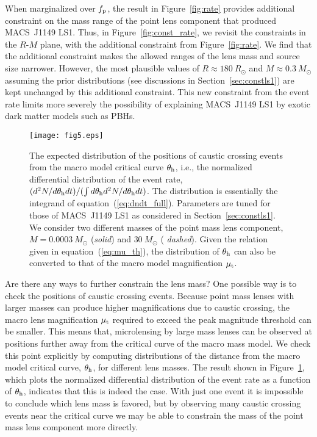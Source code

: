 \documentclass[showpacs,twocolumn,preprintnumbers,amsmath,amssymb,superscriptaddress,nofootinbib]{revtex4}
\begin{document}
When marginalized over $f_{\rm p}$, the result in
Figure~\ref{fig:rate} provides additional constraint on the mass range
of the point lens component that produced MACS~J1149 LS1. Thus, in
Figure~\ref{fig:const_rate}, we revisit the constraints in the $R$-$M$
plane, with the additional constraint from Figure~\ref{fig:rate}. We
find that the additional constraint makes the allowed ranges of the
lens mass and source size narrower. However, the most plausible values
of $R\approx 180~R_\odot$ and $M\approx 0.3~M_\odot$ assuming the
prior distributions (see discussions in Section~\ref{sec:constls1}) are
kept unchanged by this additional constraint. This new constraint from
the event rate limits more severely the possibility of explaining
MACS~J1149 LS1 by exotic dark matter models such as PBHs.

\begin{figure}[t]
\begin{center}
\texttt{[image: fig5.eps]}
\end{center}
\caption{The expected distribution of the positions of caustic
  crossing events from the macro model critical curve $\theta_{\rm
    h}$, i.e., the normalized differential distribution of the event
  rate, $(d^2N/d\theta_{\rm h}dt)/(\int d\theta_{\rm h}
  d^2N/d\theta_{\rm h}dt)$.  The distribution is essentially the
  integrand of equation~(\ref{eq:dndt_full}). Parameters are tuned for
  those of MACS~J1149 LS1 as considered in Section~\ref{sec:constls1}. We
  consider two different masses of the point mass lens component,
   $M=0.0003~M_\odot$ ({\it solid}) and $30~M_\odot$ ({\it
    dashed}). Given the relation given in equation~(\ref{eq:mu_th}),
  the distribution of $\theta_{\rm h}$ can also be converted to that of
   the macro model magnification $\mu_{\rm t}$.}
\label{fig:mudist}
\end{figure}

Are there any ways to further constrain the lens mass? One possible
way is to check the positions of caustic crossing events. Because
point mass lenses with larger masses can produce higher magnifications
due to caustic crossing, the macro lens magnification $\mu_{\rm t}$
required to exceed the peak magnitude threshold can be smaller. This
means that, microlensing by large mass lenses can be observed at
positions further away from the critical curve of the macro mass
model. We check this point explicitly by computing distributions of
the distance from the macro model critical curve, $\theta_{\rm h}$,
for different lens masses. The result shown in
Figure~\ref{fig:mudist}, which plots the normalized differential
distribution of the event rate as a function of $\theta_{\rm h}$,
indicates that this is indeed the case. With just one event it is
impossible to conclude which lens mass is favored, but by observing
many caustic crossing events near the critical curve we may be able to
constrain the mass of the point mass lens component more
directly.
\end{document}
